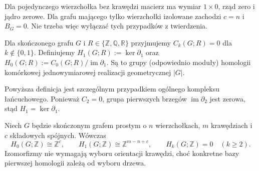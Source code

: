 \begin{uwaga}
Dla pojedynczego wierzchołka bez krawędzi macierz ma wymiar
$1\times0$, rząd zero i jądro zerowe. Dla grafu mającego tylko
wierzchołki izolowane zachodzi $c=n$ i $B_G=0$.
Nie trzeba więc wyłączać tych przypadków z twierdzenia.
\end{uwaga}

\begin{definicja}
Dla skończonego grafu $G$ i $R\in\{\mathbb Z,\mathbb Q,\mathbb R\}$
przyjmujemy $C_k(G;R)=0$ dla $k\notin\{0,1\}$.
Definiujemy $H_1(G;R):=\ker\partial_1$ oraz
$H_0(G;R):=C_0(G;R)/\operatorname{im}\partial_1$.
Są to grupy (odpowiednio moduły) homologii komórkowej
jednowymiarowej realizacji geometrycznej $|G|$.
\end{definicja}

Powyższa definicja jest szczególnym przypadkiem ogólnego kompleksu
łańcuchowego. Ponieważ $C_2=0$, grupa pierwszych brzegów
$\operatorname{im}\partial_2$ jest zerowa, stąd $H_1=\ker\partial_1$.

\begin{twierdzenie}
\label{thm:tg-homology}
Niech $G$ będzie skończonym grafem prostym o $n$ wierzchołkach,
$m$ krawędziach i $c$ składowych spójnych. Wówczas
\[
H_0(G;\mathbb Z)\cong\mathbb Z^c,\qquad
H_1(G;\mathbb Z)\cong\mathbb Z^{m-n+c},\qquad
H_k(G;\mathbb Z)=0\quad(k\ge2).
\]
Izomorfizmy nie wymagają wyboru orientacji krawędzi, choć
konkretne bazy pierwszej homologii zależą od wyboru drzewa.
\end{twierdzenie}

